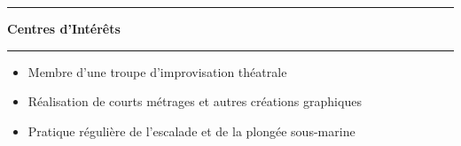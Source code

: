 \documentclass[a4paper,11pt]{article} %
\newcommand{\trad}[2]{#2}
\newcommand{\titre}[1]{%
	\begin{center}
	\rule{\textwidth}{1pt}
	\par
	\vspace{0.1cm}
        \textbf{\large #1}
	\par\rule{\textwidth}{1pt}
	\end{center}
	}
\newenvironment{customitemize}[0]
  { \begin{itemize}
    \addtolength{\itemsep}{\trad{-0.2}{0}\baselineskip}
    \addtolength{\baselineskip}{\trad{-0.2}{0}\baselineskip} }
  { \end{itemize} }
\begin{document}
\titre{\trad{Interests}{Centres d'Intérêts}}


	\begin{customitemize}
	\item \trad{Member of an improvisational theater company (4 years)}           								{Membre d'une troupe d'improvisation théatrale}
	\item \trad{Direction of short films (traditional or computer generated) and other graphical creations}   	{Réalisation de courts métrages et autres créations graphiques} %
	\item \trad{Regular practice of rock climbing (3 years) and scuba diving (8 years)}           				{Pratique régulière de l'escalade et de la plongée sous-marine}
	\end{customitemize}

	

\end{document}
